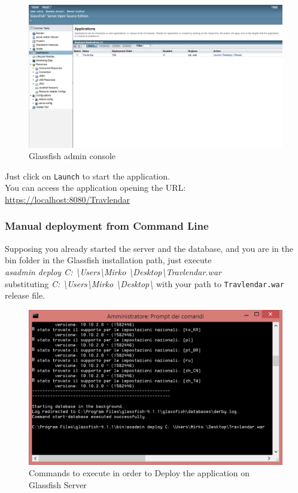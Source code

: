 \begin{figure}[H]
\begin{center}
		\includegraphics[width=1.1\textwidth]{images/glassfishdeploy}
		\caption{Glassfish admin console}
	
\end{center}
\end{figure}
Just click on \texttt{Launch} to start the application.
\\You can access the application opening the URL: \\
\href{url}{https://localhost:8080/Travlendar}


\subsubsection{Manual deployment from Command Line}
Supposing you already started the server and the database, and you are in the bin folder in the Glassfish installation path, just execute \\ \textit{asadmin deploy C: \textbackslash Users\textbackslash Mirko \textbackslash Desktop\textbackslash Travlendar.war}\\
substituting \textit{C: \textbackslash Users\textbackslash Mirko \textbackslash Desktop\textbackslash} with your path to \texttt{Travlendar.war} release file.

\begin{figure}[H]
\begin{center}
		\includegraphics[width=1.1\textwidth]{images/asadmindeploy}
		\caption{Commands to execute in order to Deploy the application on Glassfish Server}
		
\end{center}
\end{figure}

